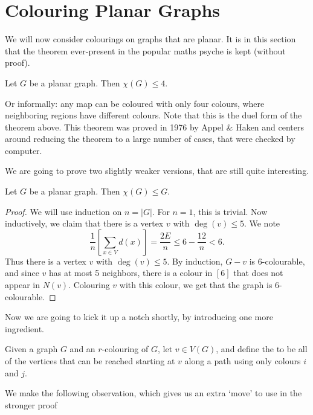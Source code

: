 \documentclass[a4paper]{scrreprt}
\begin{document}
\section{Colouring Planar Graphs}

We will now consider colourings on graphs that are planar. It is in this section that the theorem ever-present in the popular maths psyche is kept (without proof).

\begin{theorem}
	Let $G$ be a planar graph. Then $\chi(G) \leq 4$.
\end{theorem}

Or informally: any map can be coloured with only four colours, where neighboring regions have different colours. Note that this is the duel form of the theorem above.
This theorem was proved in 1976 by Appel \& Haken and centers around reducing the theorem to a large number of cases, that were checked by computer.

We are going to prove two slightly weaker versions, that are still quite interesting.

\begin{theorem}
Let $G$ be a planar graph. Then $\chi(G) \leq G$.
\end{theorem}
\begin{proof}
	We will use induction on $n = |G|$. For $n = 1$, this is trivial.
	Now inductively, we claim that there is a vertex $v$ with $\deg(v) \leq 5$. We note
	$$
	\frac{1}{n}\left[\sum_{x \in V} d(x)\right] = \frac{2E}{n} \leq 6 - \frac{12}{n} < 6.
	$$
	Thus there is a vertex $v$ with $\deg(v) \leq 5$. By induction, $G - v$ is 6-colourable, and since $v$ has at most 5 neighbors, there is a colour in $[6]$ that does not appear in $N(v)$. Colouring $v$ with this colour, we get that the graph is 6-colourable.
\end{proof}

Now we are going to kick it up a notch shortly, by introducing one more ingredient.

\begin{definition}
	Given a graph $G$ and an $r$-colouring of $G$, let $v \in V(G)$, and define the  to be all of the vertices that can be reached starting at $v$ along a path using only colours $i$ and $j$.
\end{definition}

We make the following observation, which gives us an extra `move' to use in the stronger proof
\end{document}
